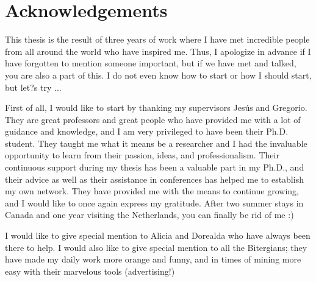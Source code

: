 \documentclass[a4paper, 12pt]{book}
\begin{document}

\chapter*{Acknowledgements}

This thesis is the result of three years of work where I have met incredible people from all around the world who have inspired me. Thus, I apologize in advance if I have forgotten to mention someone important, but if we have met and talked, you are also a part of this. I do not even know how to start or how I should start, but let?s try ...  

First of all, I would like to start by thanking my supervisors Jes\'us and Gregorio. They are great professors and great people who have provided me with a lot of guidance and knowledge, and I am very privileged to have been their Ph.D. student. They taught me what it means be a researcher and I had the invaluable opportunity to learn from their passion, ideas, and professionalism. Their continuous support during my thesis has been a valuable part in my Ph.D., and their advice as well as their assistance in conferences has helped me to establish my own network. They have provided me with the means to continue growing, and I would like to once again express my gratitude. After two summer stays in Canada and one year visiting the Netherlands, you can finally be rid of me :) 

I would like to give special mention to Alicia and Dorealda who have always been there to help. I would also like to give special mention to all the Bitergians; they have made my daily work more orange and funny, and in times of mining more easy with their marvelous tools (advertising!) 
\end{document}
